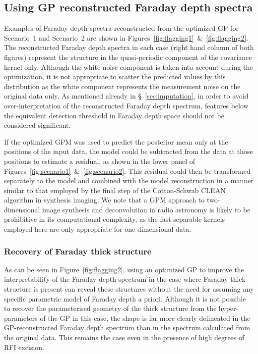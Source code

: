 \documentclass[fleqn,usenatbib]{mnras}
\begin{document}
\subsection{Using GP reconstructed Faraday depth spectra}
\label{sec:usage}

Examples of Faraday depth spectra reconstructed from the optimized GP for Scenario~1 and Scenario~2 are shown in Figures~\ref{fig:flagging1}~\&~\ref{fig:flagging2}. The reconstructed Faraday depth spectra in each case (right hand column of both figures) represent the structure in the quasi-periodic component of the covariance kernel only. Although the white noise component is taken into account during the optimization, it is not appropriate to scatter the predicted values by this distribution as the white component represents the measurement noise on the original data only. As mentioned already in \S~\ref{sec:imputation}, in order to avoid over-interpretation of the reconstructed Faraday depth spectrum, features below the equivalent detection threshold in Faraday depth space should not be considered significant.

If the optimized GPM was used to predict the posterior mean only at the positions of the input data, the model could be subtracted from the data at those positions to estimate a residual, as shown in the lower panel of Figures~\ref{fig:scenario1}~\&~\ref{fig:scenario2}. This residual could then be transformed separately to the model and combined with the model reconstruction in a manner similar to that employed by the final step of the Cotton-Schwab CLEAN algorithm in synthesis imaging. We note that a GPM approach to two-dimensional image synthesis and deconvolution in radio astronomy is likely to be prohibitive in its computational complexity, as the fast separable kernels employed here are only appropriate for one-dimensional data.

\subsubsection{Recovery of Faraday thick structure}
\label{sec:thick}

As can be seen in Figure~\ref{fig:flagging2}, using an optimized GP to improve the interpretability of the Faraday depth spectrum in the case where Faraday thick structure is present can reveal these structures without the need for assuming any specific parametric model of Faraday depth a priori. Although it is not possible to recover the parameterised geometry of the thick structure from the hyper-parameters of the GP in this case, the shape is far more clearly delineated in the GP-reconstructed Faraday depth spectrum than in the spectrum calculated from the original data. This remains the case even in the presence of high degrees of RFI excision.
\end{document}
